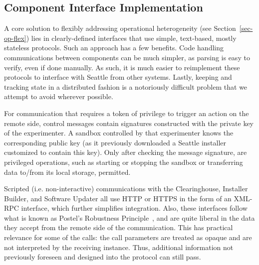 %


\subsection{Component Interface Implementation}

A core solution to flexibly addressing operational heterogeneity (see
Section~\ref{sec-op-flex}) lies in clearly-defined interfaces
that use simple, text-based, mostly stateless protocols.
Such an approach has a few benefits. Code handling communications between
components can be much simpler, as parsing is easy to verify,
even if done manually. As such, it is much easier to reimplement these protocols
to interface with Seattle from other systems. Lastly, keeping
and tracking state in a distributed fashion is a notoriously
difficult problem that we attempt to avoid wherever possible.

For communication that requires a token of privilege to trigger
an action on the remote side, control messages contain signatures
constructed with the private key of the experimenter. A
sandbox controlled by that experimenter knows the
corresponding public key (as it previously downloaded a Seattle installer
customized to contain this key). Only after checking
the message signature, are privileged operations, such as starting
or stopping the sandbox or transferring data to/from its
local storage, permitted.

Scripted (i.e. non-interactive) communications with the
Clearinghouse, Installer Builder, and Software Updater all
use \gls{HTTP} or \gls{HTTPS} in the form of an
\acrshort{XML}-\acrshort{RPC} interface, which further simplifies
integration. Also, these interfaces
follow what is known as Postel's Robustness
Principle~\cite[\S2.10]{rfc793}, and are quite liberal in the
data they accept from the remote side of the communication.
This has practical relevance for some of the calls:
the call parameters are treated as opaque and are not
interpreted by the receiving instance. Thus, additional
information not previously foreseen and designed into the
protocol can still pass.
